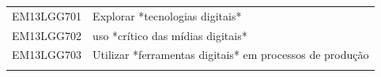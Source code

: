 \documentclass[12pt]{extarticle}
\begin{document}
\begin{longtable}{ll}
EM13LGG701 & Explorar *tecnologias digitais*                                                                                                                                                                                                                                                                                                                                                                                                                                                                                                                                                                                                                                                                                                                                                                                       \\
\rowcolor[HTML]{E0F7FA} 
EM13LGG702 & uso *crítico das mídias digitais*                                                                                                                                                                                                                                                                                                                                                                                                                                                                                                                                                                                                                                                                                                                                                                                     \\
\rowcolor[HTML]{FFF} 
EM13LGG703 & Utilizar *ferramentas digitais* em processos de produção                                                                                                                                                                                                                                                                                                                                                                                                                                                                                                                                                                                                                                                                                                                                                              \\
\rowcolor[HTML]{E0F7FA} 

\end{longtable}
\end{document}
